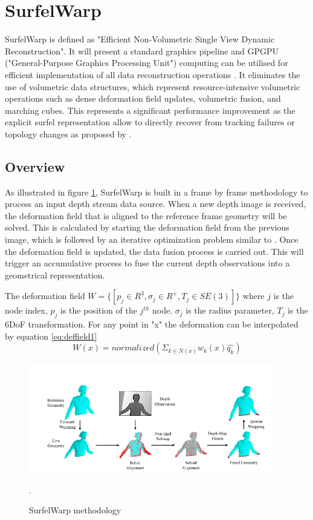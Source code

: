 \documentclass[12pt]{report}
\begin{document}
\enlargethispage{\baselineskip}

\section{SurfelWarp}
SurfelWarp is defined as "Efficient Non-Volumetric Single View Dynamic Reconstruction". It will present a standard graphics pipeline and GPGPU ("General-Purpose Graphics Processing Unit") computing can be utilised for efficient 
implementation of all data reconstruction operations . It eliminates the use of volumetric data structures, which represent resource-intensive volumetric operations such as dense deformation field updates, volumetric fusion, and marching cubes.
This represents a significant performance improvement as the explicit surfel representation allow to directly recover from tracking failures or topology changes as proposed by \citeauthor*{SurfelWarp}.

\subsection{Overview}
As illustrated in figure \ref{fig:surfelmetho}, SurfelWarp is built in a frame by frame methodology to process an input depth stream data source. 
When a new depth image is received, the deformation field that is aligned to the reference frame geometry will be solved. 
This is calculated by starting the deformation field from the previous image, which is followed by an iterative optimization problem similar to .
Once the deformation field is updated, the data fusion process is carried out. This will trigger an accumulative process to fuse the current depth observations into a geometrical representation. 

The deformation field $ W = \{[p_j \in R^{3},\sigma_{j} \in R^{+} ,T_j \in SE(3)]\}$ where $j$ is the node index, $p_j$ is the position of the $j^{th}$ node. $\sigma_j$ is the radius parameter, $T_j$ is the 6DoF transformation.
For any point in "x" the deformation can be interpolated by equation \ref{eq:deffield1}
\begin{equation}  
  W(x)=normalized(\Sigma_{k \in N(x)} w_{k}(x) \hat{q_k})
  \label{eq:deffield1}
\end{equation}

\newpage
\begin{figure}%
    \centering
    \includegraphics[width=0.95\textwidth]{surfelwarp1.png}
    \caption{SurfelWarp methodology }\cite[]{SurfelWarp}.
    \label{fig:surfelmetho}
\end{figure}
\end{document}
